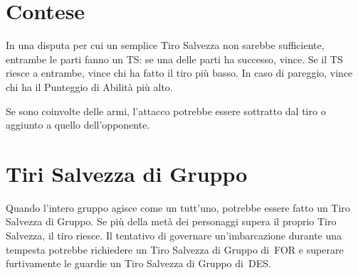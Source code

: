 \documentclass[itdr]{subfiles}
\begin{document}
\vfill

\section{Contese}
In una disputa per cui un semplice Tiro Salvezza non sarebbe sufficiente, entrambe le parti fanno un TS: se una delle parti ha successo, vince. Se il TS riesce a entrambe, vince chi ha fatto il tiro più basso. In caso di pareggio, vince chi ha il Punteggio di Abilità più alto.

Se sono coinvolte delle armi, l'attacco potrebbe essere sottratto dal tiro o aggiunto a quello dell'opponente.

\vfill

\section{Tiri Salvezza di Gruppo}
Quando l'intero gruppo agisce come un tutt'uno, potrebbe essere fatto un Tiro Salvezza di Gruppo. Se più della metà dei personaggi supera il proprio Tiro Salvezza, il tiro riesce. Il tentativo di governare un'imbarcazione durante una tempesta potrebbe richiedere un Tiro Salvezza di Gruppo di~FOR e superare furtivamente le guardie un Tiro Salvezza di Gruppo di~DES.

\vfill

\begin{comment}
\section{Gods, Religion, and Disciples}
\index{Religion}
\index{Disciple}
\index{Creed}

The nature of divine presence is highly dependent on a specific setting and thus is left to your discretion. Some worlds could be completely devoid of divine influence (though local cults might still have supernatural powers from some other source), while dwellers of other worlds can regularly observe their gods' interventions in the deals of mortals.

\subparagraph{Disciple} Class and its Creeds from the \textbf{\customref{ch:appendix_c}{Appendix C: Class-ic Edition}} could be used as a Feature to represent the most devoted adepts of cryptic cults. Unlike other Features, this one has a prerequisite of the character being a worshipper of the relevant set of teachings. When obtaining a new Experience Level, follow standard rules. Additionally, from Expert onwards, Disciples gain d4 (up to their WIL~/~2, rounded down) Followers (3hp, Simple Weapon) each time they visit a friendly settlement  and are responsible for their food, shelter, equipment, etc.
\end{comment}
\end{document}

